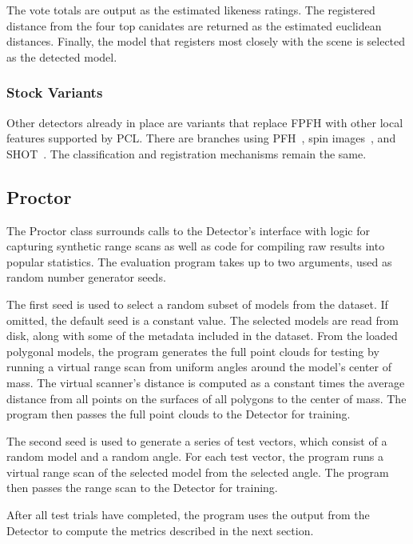 The vote totals are output as the estimated likeness ratings.
The registered distance from the four top canidates are returned as the estimated euclidean distances.
Finally, the model that registers most closely with the scene is selected as the detected model.

\subsubsection{Stock Variants}
Other detectors already in place are variants that replace FPFH with other local features supported by PCL. There are branches using PFH~\cite{pfh1, pfh2}, spin images~\cite{SpinImages}, and SHOT~\cite{shot}.
The classification and registration mechanisms remain the same.

\subsection{Proctor}
The Proctor class surrounds calls to the Detector's interface with logic for capturing synthetic range scans as well as code for compiling raw results into popular statistics.
The evaluation program takes up to two arguments, used as random number generator seeds.

The first seed is used to select a random subset of models from the dataset. If omitted, the default seed is a constant value.
The selected models are read from disk, along with some of the metadata included in the dataset.
From the loaded polygonal models, the program generates the full point clouds for testing by running a virtual range scan from uniform angles around the model's center of mass.
The virtual scanner's distance is computed as a constant times the average distance from all points on the surfaces of all polygons to the center of mass.
The program then passes the full point clouds to the Detector for training.

The second seed is used to generate a series of test vectors, which consist of a random model and a random angle.
For each test vector, the program runs a virtual range scan of the selected model from the selected angle.
The program then passes the range scan to the Detector for training.

After all test trials have completed, the program uses the output from the Detector to compute the metrics described in the next section.
